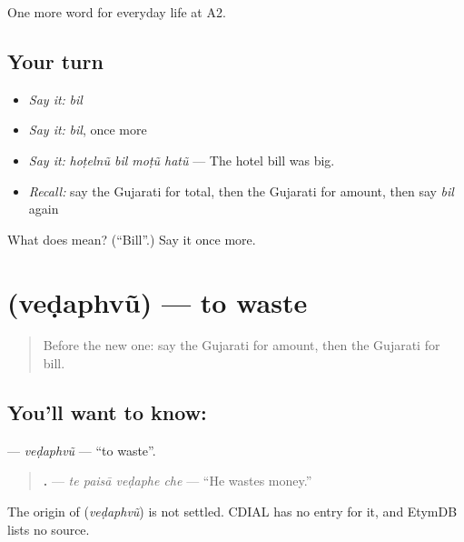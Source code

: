 \begin{grammarlens}[title={What you've built}]
One more word for everyday life at A2.
\end{grammarlens}

\subsection*{Your turn}
\begin{itemize}
\raggedright
  \item \emph{Say it:} \emph{bil}
  \item \emph{Say it:} \emph{bil}, once more
  \item \emph{Say it:} \emph{hoṭelnũ bil moṭũ hatũ} — The hotel bill was big.
  \item \emph{Recall:} say the Gujarati for total, then the Gujarati for amount, then say \emph{bil} again
\end{itemize}

\begin{tcolorbox}[breakable,colback=teal!4,colframe=teal!35!black,title={Before you move on}]
What does  mean? (\textquotedblleft{}Bill\textquotedblright{}.) Say it once more.
\end{tcolorbox}
\section[\texorpdfstring{\gu{વેડફવું} (veḍaphvũ)}{વેડફવું (veḍaphvũ)}]{ (veḍaphvũ) — to waste}

\label{lesson:GU-C192-vedaphvu}



\begin{quote}
Before the new one: say the Gujarati for amount, then the Gujarati for bill.
\end{quote}

\subsection*{You'll want to know: }
\textbf{} — \emph{veḍaphvũ} — \textquotedblleft{}to waste\textquotedblright{}.

\begin{quote}
\textbf{   .} — \emph{te paisā veḍaphe che} — \textquotedblleft{}He wastes money.\textquotedblright{}
\end{quote}

\begin{cousinweb}
The origin of \textbf{} (\emph{veḍaphvũ}) is not settled. CDIAL has no entry for it, and EtymDB lists no source.
\end{cousinweb}


